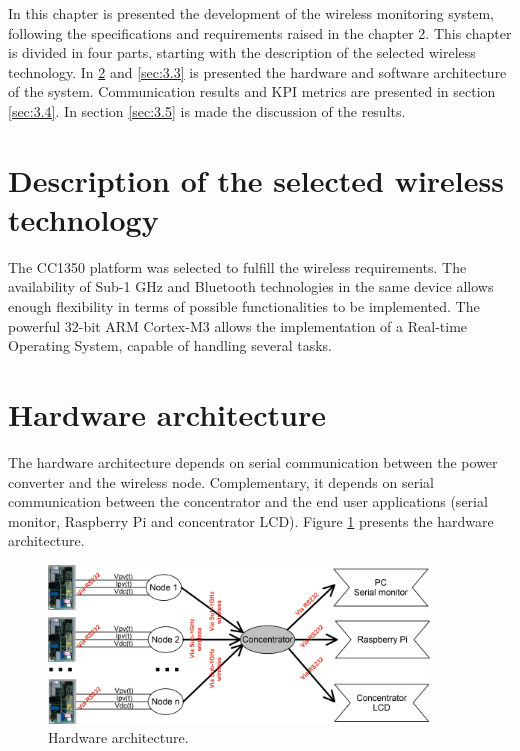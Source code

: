 In this chapter is presented the development of the wireless monitoring system, following the specifications and requirements raised in the chapter 2. This chapter is divided in four parts, starting with the description of the selected wireless technology. In \ref{sec:3.2} and \ref{sec:3.3} is presented the hardware and software architecture of the system. Communication results and KPI metrics are presented in section \ref{sec:3.4}. In section \ref{sec:3.5} is made the discussion of the results.

\section{Description of the selected wireless technology}
\label{sec:3.1}

The CC1350 platform was selected to fulfill the wireless requirements. The availability of Sub-1 GHz and Bluetooth technologies in the same device allows enough flexibility in terms of possible functionalities to be implemented. The powerful 32-bit ARM Cortex-M3 allows the implementation of a Real-time Operating System, capable of handling several tasks.

\section{Hardware architecture}
\label{sec:3.2}

The hardware architecture depends on serial communication between the power converter and the wireless node. Complementary, it depends on serial communication between the concentrator and the end user applications (serial monitor, Raspberry Pi and concentrator LCD). Figure \ref{fig:3.2.hw} presents the hardware architecture.

\begin{figure}[h!]
	\centering
	\includegraphics[width=0.9\textwidth,keepaspectratio]{figures/hw}
	\caption{Hardware architecture.}
	\label{fig:3.2.hw}
\end{figure}

